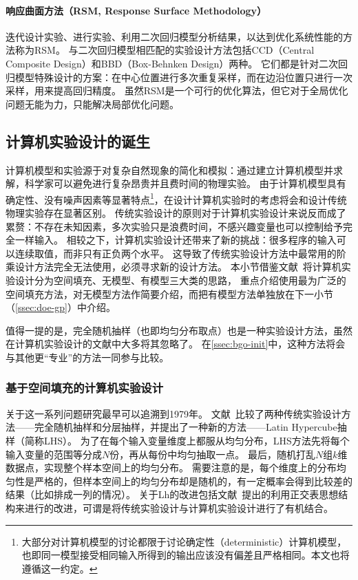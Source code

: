 \documentclass[index]{subfiles}
\begin{document}
\paragraph{响应曲面方法（RSM, Response Surface Methodology）}
迭代设计实验、进行实验、利用二次回归模型分析结果，以达到优化系统性能的方法称为RSM。
与二次回归模型相匹配的实验设计方法包括CCD（Central Composite Design）和BBD（Box-Behnken Design）两种。
它们都是针对二次回归模型特殊设计的方案：在中心位置进行多次重复采样，而在边沿位置只进行一次采样，用来提高回归精度\cite{montgomery}。
虽然RSM是一个可行的优化算法，但它对于全局优化问题无能为力，只能解决局部优化问题。

\subsection{计算机实验设计的诞生}
计算机模型和实验源于对复杂自然现象的简化和模拟：通过建立计算机模型并求解，科学家可以避免进行复杂昂贵并且费时间的物理实验。
由于计算机模型具有确定性、没有噪声因素等显著特点\footnote{大部分对计算机模型的讨论都限于讨论确定性（deterministic）计算机模型，也即同一模型接受相同输入所得到的输出应该没有偏差且严格相同。本文也将遵循这一约定。}，在设计计算机实验时的考虑将会和设计传统物理实验存在显著区别\cite{sacks1989}。
传统实验设计的原则对于计算机实验设计来说反而成了累赘：不存在未知因素，多次实验只是浪费时间，不感兴趣变量也可以控制给予完全一样输入。
相较之下，计算机实验设计还带来了新的挑战：很多程序的输入可以连续取值，而非只有正负两个水平。
这导致了传统实验设计方法中最常用的阶乘设计方法完全无法使用，必须寻求新的设计方法。
本小节借鉴文献~将计算机实验设计分为空间填充、无模型、有模型三大类的思路，
重点介绍使用最为广泛的空间填充方法，对无模型方法作简要介绍，而把有模型方法单独放在下一小节（\cref{ssec:doe-gp}）中介绍。

值得一提的是，完全随机抽样（也即均匀分布取点）也是一种实验设计方法，虽然在计算机实验设计的文献中大多将其忽略了。
在\cref{ssec:bgo-init}中，这种方法将会与其他更“专业”的方法一同参与比较。

\subsubsection{基于空间填充的计算机实验设计}
关于这一系列问题研究最早可以追溯到1979年。
文献~比较了两种传统实验设计方法——完全随机抽样和分层抽样，并提出了一种新的方法——Latin Hypercube抽样（简称LHS）。
为了在每个输入变量维度上都服从均匀分布，LHS方法先将每个输入变量的范围等分成$N$份，再从每份中均匀抽取一点。
最后，随机打乱$N$组$k$维数据点，实现整个样本空间上的均匀分布。
需要注意的是，每个维度上的分布均匀性是严格的，但样本空间上的均匀分布却是随机的，有一定概率会得到比较差的结果（比如排成一列的情况\cite{pronzato2012}）。
关于Lh的改进包括文献~提出的利用正交表思想结构来进行的改进，可谓是将传统实验设计与计算机实验设计进行了有机结合。
\end{document}
